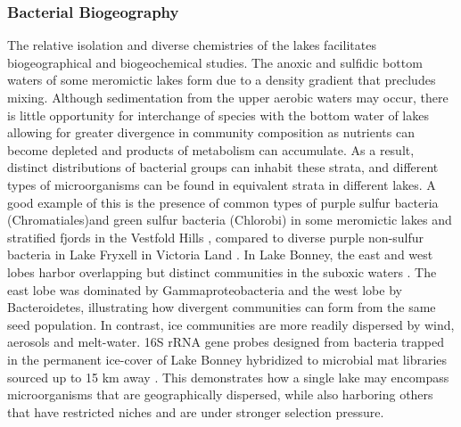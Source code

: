 \subsubsection{Bacterial Biogeography}
The relative isolation and diverse chemistries of the lakes facilitates biogeographical and biogeochemical studies. 
The anoxic and sulfidic bottom waters of some meromictic lakes form due to a density gradient that precludes mixing. 
Although sedimentation from the upper aerobic waters may occur, 
there is little opportunity for interchange of species with the bottom water of lakes allowing for greater divergence in community composition as nutrients can become depleted 
and products of metabolism can accumulate.
As a result, distinct distributions of bacterial groups can inhabit these strata, and different types of microorganisms can be found in equivalent strata in different lakes. 
A good example of this is the presence of common types of purple sulfur bacteria (Chromatiales)and green sulfur bacteria (Chlorobi) 
in some meromictic lakes and stratified fjords in the Vestfold Hills \cite{Burke1988},
compared to diverse purple non-sulfur bacteria in Lake Fryxell in Victoria Land \cite{Karr2003}. 
In Lake Bonney, the east and west lobes harbor overlapping but distinct communities in the suboxic waters \cite{Glatz2006}.
The east lobe was dominated by Gammaproteobacteria and the west lobe by Bacteroidetes, illustrating how divergent communities can form from the same seed population. 
In contrast, ice communities are more readily dispersed by wind, aerosols and melt-water. 
16S rRNA gene probes designed from bacteria trapped in the permanent ice-cover of Lake Bonney hybridized to microbial mat libraries sourced up to 15 km away \cite{Gordon2000}.
This demonstrates how a single lake may encompass microorganisms that are geographically dispersed, while also harboring others that have restricted niches and are under stronger selection pressure.


